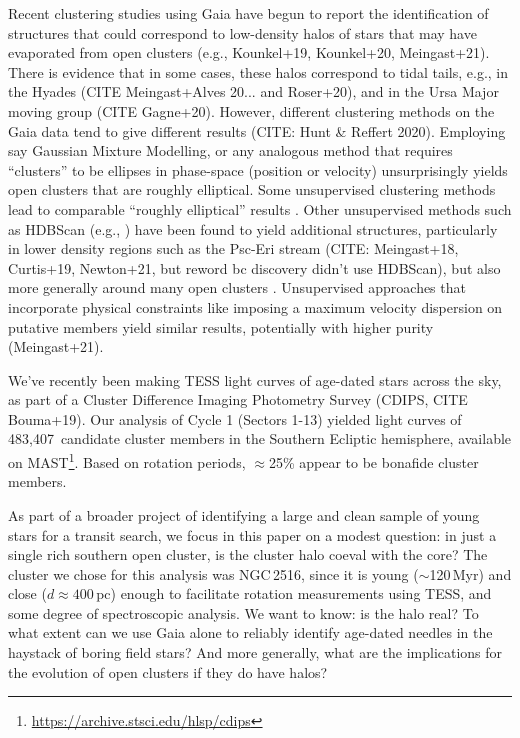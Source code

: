 \documentclass[12pt,twocolumn,tighten]{aastex63}
\newcommand{\numsouthernuniqlcs}{483{,}407\ } %
\begin{document}
Recent clustering studies using Gaia have begun to report the
identification of structures that could correspond to low-density
halos of stars that may have evaporated from open clusters (e.g.,
Kounkel+19, Kounkel+20, Meingast+21).  There is evidence that in some
cases, these halos correspond to tidal tails, e.g., in the Hyades
(CITE Meingast+Alves 20... and Roser+20), and in the Ursa Major moving
group (CITE Gagne+20).  However, different clustering methods on the
Gaia data tend to give different results (CITE: Hunt \& Reffert 2020).
Employing say Gaussian Mixture Modelling, or any analogous method that
requires ``clusters'' to be ellipses in phase-space (position or
velocity) unsurprisingly yields open clusters that are roughly
elliptical.  Some unsupervised clustering methods lead to comparable
``roughly elliptical'' results \citep[][hereafter
]{cantatgaudin_gaia_2018}.  Other
unsupervised methods such as HDBScan (e.g., \citep[][hereafter
]{kounkel_untangling_2019}) have
been found to yield additional structures, particularly in lower
density regions such as the Psc-Eri stream (CITE: Meingast+18,
Curtis+19, Newton+21, but reword bc discovery didn't use HDBScan), but
also more generally around many open clusters
\citep{kounkel_untangling_2019}.  Unsupervised approaches that
incorporate physical constraints like imposing a maximum velocity
dispersion on putative members yield similar results, potentially with
higher purity (Meingast+21).


We've recently been making TESS light curves of age-dated stars across
the sky, as part of a Cluster Difference Imaging Photometry Survey
(CDIPS, CITE Bouma+19).  Our analysis of Cycle 1 (Sectors 1-13) yielded
light curves of \numsouthernuniqlcs candidate cluster members in the
Southern Ecliptic hemisphere, available on
MAST\footnote{\url{https://archive.stsci.edu/hlsp/cdips}}.  Based on
rotation periods, $\approx$25\% appear to be bonafide cluster members. 

As part of a broader project of identifying a large and clean sample of
young stars for a transit search, we focus in this paper on a 
modest question: in just a single rich southern open cluster, is the
cluster halo coeval with the core?  The cluster we chose for this
analysis was NGC\,2516, since it is young ($\sim$120\,Myr) and close
($d\approx400$\,pc) enough to facilitate rotation measurements using
TESS, and some degree of spectroscopic analysis.  We want to know: is
the halo real? To what extent can we use Gaia alone to reliably identify
age-dated needles in the haystack of boring field stars?  And more
generally, what are the implications for the evolution of open clusters
if they do have halos?
\end{document}
